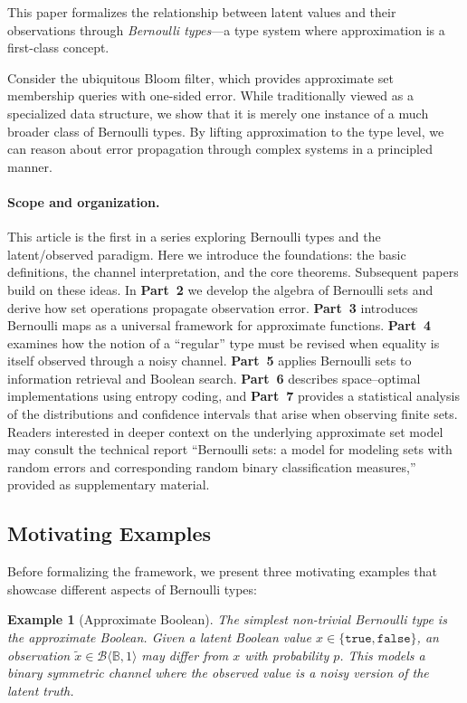 \documentclass[11pt,final,hidelinks]{article}
\newtheorem{example}[theorem]{Example}
\newcommand{\bernoulli}[2]{\mathcal{B}\langle #1, #2 \rangle}
\newcommand{\Bool}{\mathbb{B}}
\newcommand{\True}{\mathtt{true}}
\newcommand{\False}{\mathtt{false}}
\begin{document}
This paper formalizes the relationship between latent values and their observations through \emph{Bernoulli types}—a type system where approximation is a first-class concept.

Consider the ubiquitous Bloom filter, which provides approximate set membership queries with one-sided error. While traditionally viewed as a specialized data structure, we show that it is merely one instance of a much broader class of Bernoulli types. By lifting approximation to the type level, we can reason about error propagation through complex systems in a principled manner.

\paragraph{Scope and organization.}  This article is the first in a series exploring Bernoulli types and the latent/observed paradigm.  Here we introduce the foundations: the basic definitions, the channel interpretation, and the core theorems.  Subsequent papers build on these ideas.  In \textbf{Part~2} we develop the algebra of Bernoulli sets and derive how set operations propagate observation error.  \textbf{Part~3} introduces Bernoulli maps as a universal framework for approximate functions.  \textbf{Part~4} examines how the notion of a ``regular'' type must be revised when equality is itself observed through a noisy channel.  \textbf{Part~5} applies Bernoulli sets to information retrieval and Boolean search.  \textbf{Part~6} describes space–optimal implementations using entropy coding, and \textbf{Part~7} provides a statistical analysis of the distributions and confidence intervals that arise when observing finite sets.  Readers interested in deeper context on the underlying approximate set model may consult the technical report ``Bernoulli sets: a model for modeling sets with random errors and corresponding random binary classification measures,'' provided as supplementary material.

\subsection{Motivating Examples}

Before formalizing the framework, we present three motivating examples that showcase different aspects of Bernoulli types:

\begin{example}[Approximate Boolean]
The simplest non-trivial Bernoulli type is the approximate Boolean. Given a latent Boolean value $x \in \{\True, \False\}$, an observation $\tilde{x} \in \bernoulli{\Bool}{1}$ may differ from $x$ with probability $p$. This models a binary symmetric channel where the observed value is a noisy version of the latent truth.
\end{example}
\end{document}
